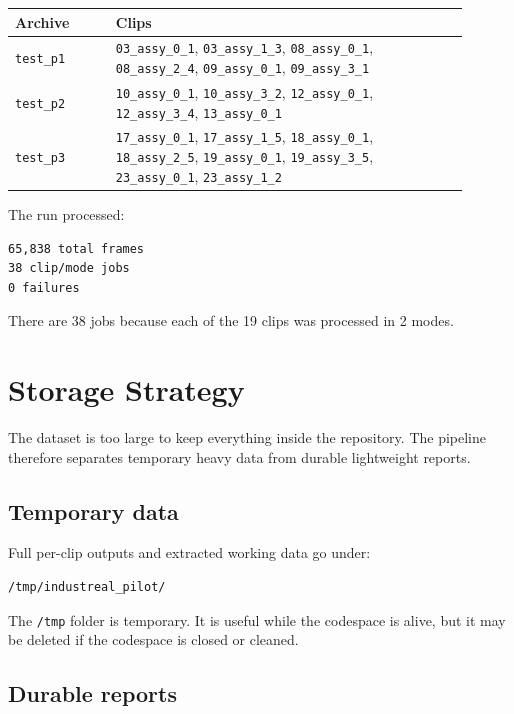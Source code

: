 \documentclass[11pt,a4paper]{article}
\begin{document}
\begin{longtable}{p{0.20\linewidth} p{0.70\linewidth}}
\toprule
\textbf{Archive} & \textbf{Clips} \\
\midrule
\endhead
\texttt{test\_p1} & \texttt{03\_assy\_0\_1}, \texttt{03\_assy\_1\_3}, \texttt{08\_assy\_0\_1}, \texttt{08\_assy\_2\_4}, \texttt{09\_assy\_0\_1}, \texttt{09\_assy\_3\_1} \\
\texttt{test\_p2} & \texttt{10\_assy\_0\_1}, \texttt{10\_assy\_3\_2}, \texttt{12\_assy\_0\_1}, \texttt{12\_assy\_3\_4}, \texttt{13\_assy\_0\_1} \\
\texttt{test\_p3} & \texttt{17\_assy\_0\_1}, \texttt{17\_assy\_1\_5}, \texttt{18\_assy\_0\_1}, \texttt{18\_assy\_2\_5}, \texttt{19\_assy\_0\_1}, \texttt{19\_assy\_3\_5}, \texttt{23\_assy\_0\_1}, \texttt{23\_assy\_1\_2} \\
\bottomrule
\end{longtable}

The run processed:

\begin{lstlisting}
65,838 total frames
38 clip/mode jobs
0 failures
\end{lstlisting}

There are 38 jobs because each of the 19 clips was processed in 2 modes.

\section{Storage Strategy}

The dataset is too large to keep everything inside the repository. The pipeline therefore separates temporary heavy data from durable lightweight reports.

\subsection{Temporary data}

Full per-clip outputs and extracted working data go under:

\begin{lstlisting}
/tmp/industreal_pilot/
\end{lstlisting}

The \texttt{/tmp} folder is temporary. It is useful while the codespace is alive, but it may be deleted if the codespace is closed or cleaned.

\subsection{Durable reports}
\end{document}
